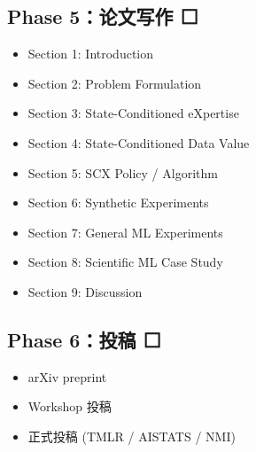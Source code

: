 \documentclass[
  12pt,
]{ctexart}
\providecommand{\tightlist}{%
  \setlength{\itemsep}{0pt}\setlength{\parskip}{0pt}}
\begin{document}
\subsection{Phase 5：论文写作 ⬜}\label{phase-5ux8bbaux6587ux5199ux4f5c}

\begin{itemize}
\tightlist
\item[$\square$]
  Section 1: Introduction
\item[$\square$]
  Section 2: Problem Formulation
\item[$\square$]
  Section 3: State-Conditioned eXpertise
\item[$\square$]
  Section 4: State-Conditioned Data Value
\item[$\square$]
  Section 5: SCX Policy / Algorithm
\item[$\square$]
  Section 6: Synthetic Experiments
\item[$\square$]
  Section 7: General ML Experiments
\item[$\square$]
  Section 8: Scientific ML Case Study
\item[$\square$]
  Section 9: Discussion
\end{itemize}

\subsection{Phase 6：投稿 ⬜}\label{phase-6ux6295ux7a3f}

\begin{itemize}
\tightlist
\item[$\square$]
  arXiv preprint
\item[$\square$]
  Workshop 投稿
\item[$\square$]
  正式投稿 (TMLR / AISTATS / NMI)
\end{itemize}
\end{document}

